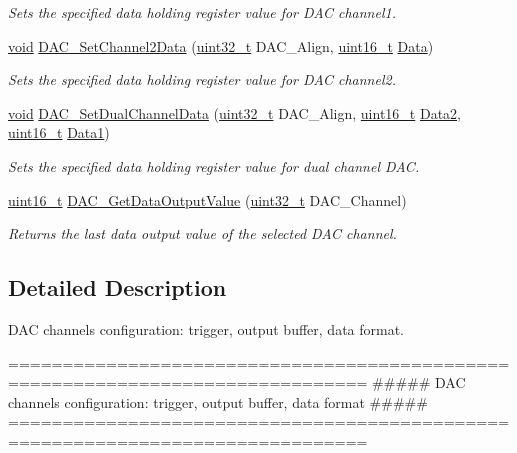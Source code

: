 \begin{DoxyCompactItemize}
\begin{DoxyCompactList}\small\item\em Sets the specified data holding register value for D\-A\-C channel1. \end{DoxyCompactList}\item 
\hyperlink{group___n_a_m_e_ga18028b8badbf1ea7e704ccac3c488e82}{void} \hyperlink{group___d_a_c___group1_ga44e12006ec186791378d132da8541552}{D\-A\-C\-\_\-\-Set\-Channel2\-Data} (\hyperlink{stdint_8h_a435d1572bf3f880d55459d9805097f62}{uint32\-\_\-t} D\-A\-C\-\_\-\-Align, \hyperlink{stdint_8h_a273cf69d639a59973b6019625df33e30}{uint16\-\_\-t} \hyperlink{group___copter_control_b_l_ga6f3335509cc4943e20df66f72483910c}{Data})
\begin{DoxyCompactList}\small\item\em Sets the specified data holding register value for D\-A\-C channel2. \end{DoxyCompactList}\item 
\hyperlink{group___n_a_m_e_ga18028b8badbf1ea7e704ccac3c488e82}{void} \hyperlink{group___d_a_c___group1_ga4ca2cfdf56ab35a23f2517f23d7fbb24}{D\-A\-C\-\_\-\-Set\-Dual\-Channel\-Data} (\hyperlink{stdint_8h_a435d1572bf3f880d55459d9805097f62}{uint32\-\_\-t} D\-A\-C\-\_\-\-Align, \hyperlink{stdint_8h_a273cf69d639a59973b6019625df33e30}{uint16\-\_\-t} \hyperlink{group___copter_control_b_l_gaf5f70ba2c733202d55d5ec7eda71995a}{Data2}, \hyperlink{stdint_8h_a273cf69d639a59973b6019625df33e30}{uint16\-\_\-t} \hyperlink{group___copter_control_b_l_ga15766c5ec55ae360109b7d9bef6999b5}{Data1})
\begin{DoxyCompactList}\small\item\em Sets the specified data holding register value for dual channel D\-A\-C. \end{DoxyCompactList}\item 
\hyperlink{stdint_8h_a273cf69d639a59973b6019625df33e30}{uint16\-\_\-t} \hyperlink{group___d_a_c___group1_ga51274838de1e5dd012a82d7f44d7a50b}{D\-A\-C\-\_\-\-Get\-Data\-Output\-Value} (\hyperlink{stdint_8h_a435d1572bf3f880d55459d9805097f62}{uint32\-\_\-t} D\-A\-C\-\_\-\-Channel)
\begin{DoxyCompactList}\small\item\em Returns the last data output value of the selected D\-A\-C channel. \end{DoxyCompactList}\end{DoxyCompactItemize}


\subsection{Detailed Description}
D\-A\-C channels configuration\-: trigger, output buffer, data format. \begin{DoxyVerb} ===============================================================================
    ##### DAC channels configuration: trigger, output buffer, data format #####
 ===============================================================================  \end{DoxyVerb}


